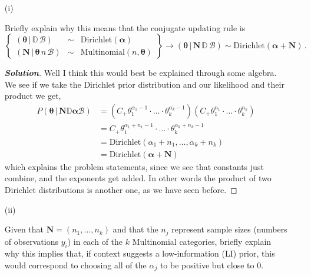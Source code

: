 \documentclass[12pt]{article}
\newcommand{\given}{\, | \,}
\newcommand{\lrp}[1]{\left(#1\right)}
\newenvironment{solution}{\begin{tcolorbox}[breakable]\begin{proof}[\textbf{\textit{Solution}}] }{\end{proof}\end{tcolorbox}}
\begin{document}
\begin{itemize}
\begin{itemize}
\begin{itemize}

\item[(i)]

Briefly explain why this means that the conjugate updating rule is
\begin{equation} \label{e:multinomial-13}
\left\{ \begin{array}{ccc} ( \bm{ \theta } \given \mathbb{ D } \, \mathcal{ B } ) & \sim & \textrm{Dirichlet} ( \bm{ \alpha } ) \\ ( \bm{ N } \given \bm{ \theta } \, n \, \mathcal{ B } ) & \sim & \textrm{Multinomial} ( n, \bm{ \theta } ) \end{array} \right\} \longrightarrow ( \bm{ \theta } \given \bm{ N } \, \mathbb{ D } \, \mathcal{ B } ) \sim \textrm{Dirichlet} ( \bm{ \alpha } + \bm{ N } ) \, .
\end{equation} 
\fbox{\textbf{\textit{[5 points]}}}

\begin{solution}
    Well I think this would best be explained through some algebra. We see if we take the Dirichlet prior distribution and our likelihood and their product we get,
    \begin{align*}
        P(\bm{\theta} \given \bm{N} \mathbb{D} \bm{\alpha} \mathcal{B}) &= \lrp{C_+\theta_1^{\alpha_1 -1} \cdot \dots \cdot \theta_k^{\alpha_k - 1}}\lrp{C_+ \theta_1^{n_1}\cdot \dots \cdot \theta_k^{n_k}}  \\
        &=C_+\theta_1^{\alpha_1 + n_1 -1} \cdot \dots \cdot \theta_k^{\alpha_k + n_k -1 } \\
        &=\text{Dirichlet}(\alpha_1 + n_1, \dots , \alpha_k + n_k) \\
        &=\text{Dirichlet}(\bm{\alpha} + \bm{N}) 
    \end{align*}
    which explains the problem statements, since we see that constants just combine, and the exponents get added. In other words the product of two Dirichlet distributions is another one, as we have seen before.  
\end{solution}

\item[(ii)]

Given that $\bm{ N } = ( n_1, \dots, n_k )$ and that the $n_j$ represent sample sizes (numbers of observations $y_i$) in each of the $k$ Multinomial categories, briefly explain why this implies that, if context suggests a low-information (LI) prior, this would correspond to choosing all of the $\alpha_j$ to be positive but close to 0. \textit{\fbox{\textbf{[5 points]}}}


\end{itemize}
\end{itemize}
\end{itemize}
\end{document}
